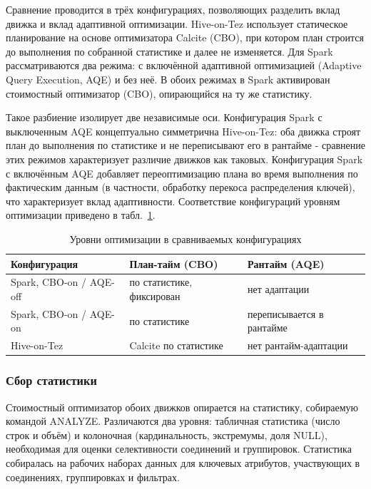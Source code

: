 \documentclass[12pt,letterpaper, onecolumn]{exam}
\begin{document}
Сравнение проводится в трёх конфигурациях, позволяющих разделить вклад движка
и вклад адаптивной оптимизации. Hive-on-Tez использует статическое
планирование на основе оптимизатора Calcite (CBO), при котором план строится
до выполнения по собранной статистике и далее не изменяется. Для Spark
рассматриваются два режима: с включённой адаптивной оптимизацией
(Adaptive Query Execution, AQE) и без неё. В обоих режимах в Spark
активирован стоимостный оптимизатор (CBO), опирающийся на ту же статистику.

Такое разбиение изолирует две независимые оси. Конфигурация Spark с выключенным
AQE концептуально симметрична Hive-on-Tez: оба движка строят план до выполнения
по статистике и не переписывают его в рантайме - сравнение этих режимов
характеризует различие движков как таковых. Конфигурация Spark с включённым AQE
добавляет переоптимизацию плана во время выполнения по фактическим данным
(в частности, обработку перекоса распределения ключей), что характеризует вклад
адаптивности. Соответствие конфигураций уровням оптимизации приведено
в табл.~\ref{tab:opt-matrix}.

\begin{table}[t]
\centering
\caption{Уровни оптимизации в сравниваемых конфигурациях}
\label{tab:opt-matrix}
\begin{tabular}{|l|l|l|}
\hline
\textbf{Конфигурация} & \textbf{План-тайм (CBO)} & \textbf{Рантайм (AQE)} \\
\hline
Spark, CBO-on / AQE-off & по статистике, фиксирован & нет адаптации \\
Spark, CBO-on / AQE-on  & по статистике & переписывается в рантайме \\
Hive-on-Tez             & Calcite по статистике & нет рантайм-адаптации \\
\hline
\end{tabular}
\end{table}

\subsubsection{Сбор статистики}
Стоимостный оптимизатор обоих движков опирается на статистику, собираемую
командой ANALYZE. Различаются два уровня: табличная статистика
(число строк и объём) и колоночная (кардинальность, экстремумы, доля
NULL), необходимая для оценки селективности соединений и группировок.
Статистика собиралась на рабочих наборах данных для ключевых атрибутов,
участвующих в соединениях, группировках и фильтрах.
\end{document}
